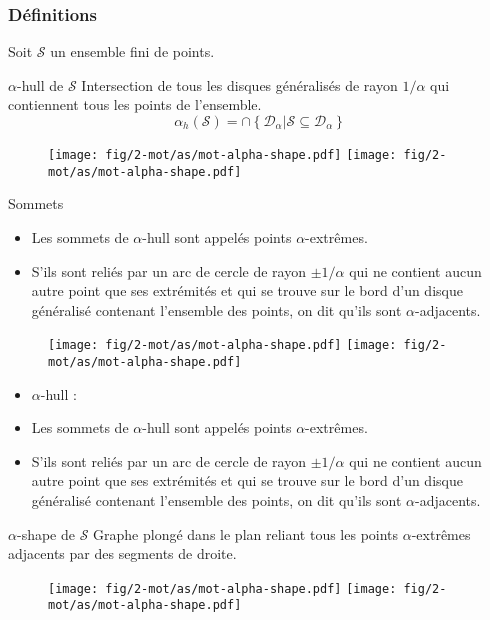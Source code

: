 \begin{frame}
\frametitle{Définitions}
{ Soit $\mathcal{S}$ un ensemble fini de points.
  \begin{block}{$\alpha$-hull de $\mathcal{S}$}
    Intersection de tous les disques généralisés de rayon $1/\alpha$ qui contiennent tous les points de l'ensemble.
    $$ \alpha_h(\mathcal{S}) = \cap \left\{ \mathcal{D}_{\alpha} | \mathcal{S} \subseteq \mathcal{D}_{\alpha} \right\}$$
    \begin{figure}[H]
      \centering
      \texttt{[image: fig/2-mot/as/mot-alpha-shape.pdf]}
      \texttt{[image: fig/2-mot/as/mot-alpha-shape.pdf]}
    \end{figure} 
  \end{block}

  \begin{block}{Sommets}
    \begin{itemize}
      \item Les sommets de $\alpha$-hull sont appelés points $\alpha$-extrêmes.
      \item S'ils sont reliés par un arc de cercle de rayon $\pm 1/ \alpha$ qui ne contient aucun autre point que ses extrémités et qui se trouve sur le bord d'un disque généralisé contenant l'ensemble des points, on dit qu'ils sont $\alpha$-adjacents.
    \end{itemize}
  \end{block}
}
{
  \begin{block}{}
    \vspace{-0.2cm}
    \begin{figure}[H]
      \centering
      \texttt{[image: fig/2-mot/as/mot-alpha-shape.pdf]}
      \texttt{[image: fig/2-mot/as/mot-alpha-shape.pdf]}
    \end{figure} 
    \vspace{-1cm}
    \begin{itemize}
      \item $\alpha$-hull :
      \item Les sommets de $\alpha$-hull sont appelés points $\alpha$-extrêmes.
      \item S'ils sont reliés par un arc de cercle de rayon $\pm 1/ \alpha$ qui ne contient aucun autre point que ses extrémités et qui se trouve sur le bord d'un disque généralisé contenant l'ensemble des points, on dit qu'ils sont $\alpha$-adjacents.
    \end{itemize}
  \end{block}


  \begin{block}{$\alpha$-shape de $\mathcal{S}$}
        Graphe plongé dans le plan reliant tous les points $\alpha$-extrêmes adjacents par des segments de droite.
    \begin{figure}[H]
      \centering
      \texttt{[image: fig/2-mot/as/mot-alpha-shape.pdf]}
      \texttt{[image: fig/2-mot/as/mot-alpha-shape.pdf]}
    \end{figure}
  \end{block}
}
\end{frame}

